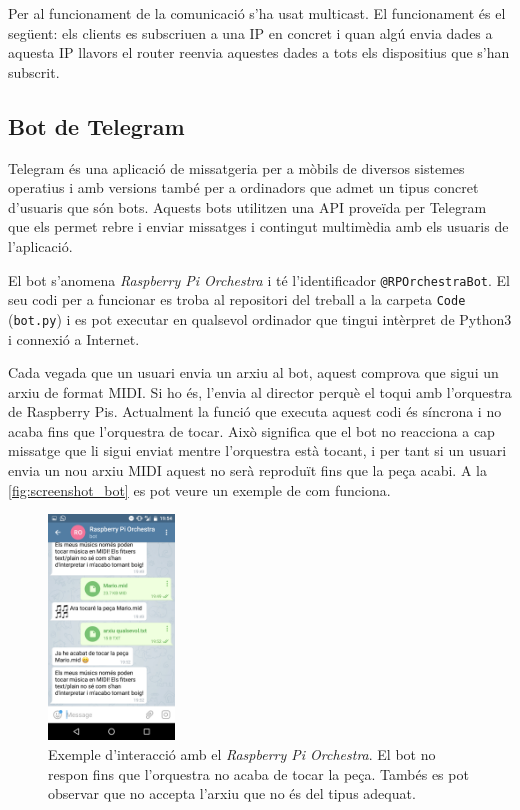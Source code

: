 \documentclass[a4paper]{paper}
\begin{document}
Per al funcionament de la comunicació s'ha usat multicast. El funcionament és el següent: els clients es subscriuen a una IP en concret i quan algú envia dades a aquesta IP llavors el router reenvia aquestes dades a tots els dispositius que s'han subscrit.



\subsection{Bot de Telegram}
Telegram\cite{telegram} és una aplicació de missatgeria per a mòbils de diversos sistemes operatius i amb versions també per a ordinadors que admet un tipus concret d'usuaris que són bots. Aquests bots utilitzen una API proveïda per Telegram que els permet rebre i enviar missatges i contingut multimèdia amb els usuaris de l'aplicació.

El bot s'anomena \emph{Raspberry Pi Orchestra} i té l'identificador \texttt{@RPOrchestraBot}. El seu codi per a funcionar es troba al repositori del treball a la carpeta \texttt{Code} (\texttt{bot.py}) i es pot executar en qualsevol ordinador que tingui intèrpret de Python3 i connexió a Internet.

Cada vegada que un usuari envia un arxiu al bot, aquest comprova que sigui un arxiu de format MIDI. Si ho és, l'envia al director perquè el toqui amb l'orquestra de Raspberry Pis. Actualment la funció que executa aquest codi és síncrona i no acaba fins que l'orquestra de tocar. Això significa que el bot no reacciona a cap missatge que li sigui enviat mentre l'orquestra està tocant, i per tant si un usuari envia un nou arxiu MIDI aquest no serà reproduït fins que la peça acabi. A la \autoref{fig:screenshot_bot} es pot veure un exemple de com funciona.

\begin{figure}
	\centering
	\includegraphics[width=0.3\textwidth]{images/screenshot_bot.png}
	\caption{Exemple d'interacció amb el \emph{Raspberry Pi Orchestra}. El bot no respon fins que l'orquestra no acaba de tocar la peça. Tambés es pot observar que no accepta l'arxiu que no és del tipus adequat.}
	\label{fig:screenshot_bot}
\end{figure}
\end{document}
